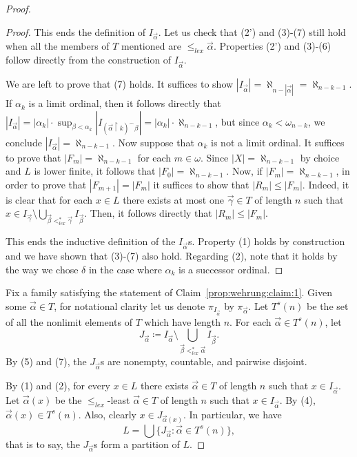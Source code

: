 \documentclass[]{amsart}
\theoremstyle{definition}
\theoremstyle{remark}
\begin{document}
\begin{proof}
\begin{proof}
This ends the definition of $I_{\vec{\alpha}}$. Let us check that (2') and (3)-(7) still hold when all the members of $T$ mentioned are $\le_{lex} \vec{\alpha}$. Properties (2') and (3)-(6) follow directly from the construction of $I_{\vec{\alpha}}$. 

We are left to prove that (7) holds. It suffices to show $|I_{\vec{\alpha}}| = \aleph_{n-|\vec{\alpha}|} = \aleph_{n-k-1}$. If $\alpha_k$ is a limit ordinal, then it follows directly that $|I_{\vec{\alpha}}| = |\alpha_k| \cdot \sup_{\beta < \alpha_k} |I_{(\vec{\alpha} \upharpoonright k)^\smallfrown \beta}| = |\alpha_k| \cdot \aleph_{n-k-1}$, but since $\alpha_k < \omega_{n-k}$, we conclude $|I_{\vec{\alpha}}| = \aleph_{n-k-1}$. Now suppose that $\alpha_k$ is not a limit ordinal. It suffices to prove that $|F_m| = \aleph_{n-k-1}$ for each $m \in \omega$. Since $|X| = \aleph_{n-k-1}$ by choice and $L$ is lower finite, it follows that $|F_0| = \aleph_{n-k-1}$. Now, if $|F_m| = \aleph_{n-k-1}$, in order to prove that $|F_{m+1}| = |F_m|$ it suffices to show that $|R_m| \le |F_m|$. Indeed, it is clear that for each $x \in L$ there exists at most one $\vec{\gamma} \in T$ of length $n$ such that $x \in I_{\vec{\gamma}} \setminus \bigcup_{\vec{\beta} <^*_{lex} \vec{\gamma}} I_{\vec{\beta}}$. Then, it follows directly that $|R_m| \le |F_m|$. 

This ends the inductive definition of the $I_{\vec{\alpha}}$s. Property (1) holds by construction and we have shown that (3)-(7) also hold. Regarding (2), note that it holds by the way we chose $\delta$ in the case where $\alpha_k$ is a successor ordinal. 
\end{proof}

Fix a family satisfying the statement of Claim~\ref{prop:wehrung:claim:1}.
Given some $\vec{\alpha} \in T$, for notational clarity let us denote $\pi_{I_{\vec{\alpha}}}$ by $\pi_{\vec{\alpha}}$. Let $T^s(n)$ be the set of all the nonlimit elements of $T$ which have length $n$. For each $\vec{\alpha} \in T^s(n)$, let
\[
J_{\vec{\alpha}} \coloneqq I_{\vec{\alpha}} \setminus \bigcup_{\vec{\beta} <^*_{lex} \vec{\alpha}}I_{\vec{\beta}}.
\]
By (5) and (7), the $J_{\vec{\alpha}}$s are nonempty, countable, and pairwise disjoint.

By (1) and (2), for every $x \in L$ there exists $\vec{\alpha} \in T$ of length $n$ such that $x \in I_{\vec{\alpha}}$. Let $\vec{\alpha}(x)$ be the $\le_{lex}$-least $\vec{\alpha} \in T$ of length $n$ such that $x \in I_{\vec{\alpha}}$. By (4), $\vec{\alpha}(x) \in T^s(n)$. Also,  clearly $x \in J_{\vec{\alpha}(x)}$. In particular, we have
\begin{equation}\label{eq:wehrung}
L = \bigcup \big\{J_{\vec{\alpha}} : \vec{\alpha} \in T^s(n)\big\},
\end{equation}
that is to say, the $J_{\vec{\alpha}}$s form a partition of $L$.


\end{proof}
\end{document}
